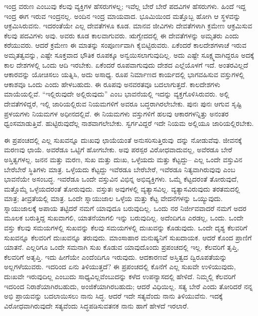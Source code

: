ಇಂದ್ರ ವರುಣ ಎಂಬುವು ಕೆಲವು ವ್ಯಕ್ತಿಗಳ ಹೆಸರುಗಳಲ್ಲ; ಇವೆಲ್ಲ ಬೇರೆ ಬೇರೆ ಪದವಿಗಳ ಹೆಸರುಗಳು. ಹಿಂದೆ ಇದ್ದ ಇಂದ್ರ ಈಗ ಇರುವ ಇಂದ್ರನಲ್ಲ. ಅಂದಿನ ಇಂದ್ರ ಮಾಯವಾದ. ಭೂಮಿಯಿಂದ ಮತ್ತೊಬ್ಬ ಹೋಗಿ ಆ ಸ್ಥಳವನ್ನು ಆಕ್ರಮಿಸಿರುವನು. ಇದರಂತೆಯೇ ಎಲ್ಲ ದೇವತೆಗಳೂ ಕೂಡ. ಮಾನವ ಜೀವಿಗಳು ದೇವತೆಗಳಾಗಿ ಕ್ರಮೇಣ ಆಕ್ರಮಿಸುವ ಕೆಲವು ಪದವಿಗಳು ಅವು. ಅವರು ಕೂಡ ಕಾಲವಾಗುವರು. ಋಗ್ವೇದದಲ್ಲಿ ಈ ದೇವತೆಗಳನ್ನು ಅಮೃತರು ಎಂದು ಕರೆಯುವರು. ಆದರೆ ಕ್ರಮೇಣ ಈ ಮಾತನ್ನು ಸಂಪೂರ್ಣವಾಗಿ ಕೈಬಿಟ್ಟಿರುವರು. ಏಕೆಂದರೆ ಕಾಲದೇಶಗಳಾಚೆ ಇರುವ ಅಮೃತತ್ವವನ್ನು, ಎಷ್ಟೇ ಸೂಕ್ತವಾದ ಭೌತಿಕ ರೂಪಕ್ಕೂ ಅನ್ವಯಿಸಲಾಗುವುದಿಲ್ಲ. ಅದು ಎಷ್ಟೇ ಸೂಕ್ಷ್ಮವಾಗಿದ್ದರೂ ಅದಕ್ಕೆ ಕಾಲ ದೇಶಗಳಲ್ಲಿ ಒಂದು ಆದಿ ಇರಬೇಕು. ಏಕೆಂದರೆ ರೂಪವಾಗುವುದು ದೇಶದ ಎಲ್ಲೆಯೊಳಗೆ ಇದೆ. ಅಂತರವಿಲ್ಲದೆ ಆಕಾರವನ್ನು ಯೋಚಿಸಲು ಯತ್ನಿಸಿ, ಅದು ಅಸಾಧ್ಯ. ರೂಪ ನಿರ್ಮಾಣದ ಕಾರ್ಯದಲ್ಲಿ ಭಾಗವಹಿಸುವ ವಸ್ತುಗಳಲ್ಲಿ ಆಕಾಶವೂ ಒಂದು ಎಂದು ಹೇಳಬಹುದು. ಈ ರೂಪವು ಅನವರತವೂ ಬದಲಾಗುತ್ತದೆ. ಕಾಲದೇಶಗಳು ಮಾಯೆಯಲ್ಲಿವೆ. “ಇಲ್ಲಿರುವುದೇ ಅಲ್ಲಿರುವುದು” ಎಂಬ ಭಾವನೆಯಲ್ಲಿ ಇದನ್ನು ವ್ಯಕ್ತಗೊಳಿಸಿರುವರು. ಅಲ್ಲಿ ದೇವತೆಗಳಿದ್ದರೆ, ಇಲ್ಲಿ ಜಾರಿಯಲ್ಲಿರುವ ನಿಯಮಗಳಿಗೆ ಅವರೂ ಬದ್ಧರಾಗಿರಲೇಬೇಕು. ಪುನಃ ಪುನಃ ಆಗುವ ಸೃಷ್ಟಿ ಪ್ರಳಯಗಳು ನಿಯಮಗಳ ಅಧೀನದಲ್ಲಿವೆ. ಈ ನಿಯಮಗಳು ವಸ್ತುಗಳಿಗೆ ಹಲವು ಆಕಾರಗಳನ್ನಿತ್ತು ಅನಂತರ ಧ್ವಂಸಮಾಡುತ್ತಿವೆ. ಹುಟ್ಟಿರುವುದೆಲ್ಲ ನಾಶವಾಗಲೇಬೇಕು. ಸ್ವರ್ಗವಿದ್ದರೆ ಇದೇ ನಿಯಮ ಅಲ್ಲಿಯೂ ಜಾರಿಯಲ್ಲಿರಬೇಕು.

\vskip 0.2cm 

ಈ ಪ್ರಪಂಚದಲ್ಲಿ ಎಲ್ಲ ಸುಖವನ್ನೂ ದುಃಖವು ಛಾಯೆಯಂತೆ ಅನುಸರಿಸುತ್ತಿರುವು\break\ ದನ್ನು ನೋಡುವೆವು. ಜೀವನಕ್ಕೆ ಮರಣವು ಛಾಯೆ. ಅವರೆಡೂ ಒಟ್ಟಿಗೆ ಹೋಗಬೇಕು. ಅವು ಪರಸ್ಪರ ವಿರೋಧವಾದುವಲ್ಲ, ಅವೆರಡೂ ಬೇರೆ ಅಸ್ತಿತ್ವಗಳಲ್ಲ. ಜನನ ಮತ್ತು ಮರಣ, ಸುಖ ಮತ್ತು ದುಃಖ, ಒಳ್ಳೆಯದು ಮತ್ತು ಕೆಟ್ಟದ್ದು– ಎಲ್ಲ ಒಂದೇ ವಸ್ತುವಿನ ಬೇರೆಬೇರೆ ಸ್ಥಿತಿಗಳು ಮಾತ್ರ. ಒಳ್ಳೆಯದು ಕೆಟ್ಟದ್ದು ಇವೆರಡೂ ಬೇರೆಬೇರೆ, ಇವೆರಡೂ ನಿತ್ಯವಾಗಿರುವುವು ಎಂಬ ಭಾವನೆಯೇ ಅಸಂಬದ್ಧ. ಇವರೆಡೂ ಒಂದೇ ವಸ್ತುವಿನ ವಿಭಿನ್ನ ಅಭಿವ್ಯಕ್ತಿಗಳು. ಒಮ್ಮೆ ಕೆಟ್ಟದರಂತೆ ತೋರುವುದೆ, ಮತ್ತೊಮ್ಮೆ ಒಳ್ಳೆಯದರಂತೆ ತೋರುವುದು. ವಸ್ತುತಃ ಅವುಗಳಲ್ಲಿ ವ್ಯತ್ಯಾಸವಿಲ್ಲ. ವ್ಯತ್ಯಾಸವಿರುವುದು ತರತಮದಲ್ಲಿ ಮಾತ್ರ; ತೀವ್ರತೆಯಲ್ಲಿ ಮಾತ್ರ. ಒಂದೇ ಸ್ನಾಯುಜಾಲ ಒಳ್ಳೆಯ ಮತ್ತು ಕೆಟ್ಟ ವೇದನೆಗಳನ್ನು ಒಯ್ಯುವುದು. ಸ್ನಾಯುಜಾಲಕ್ಕೆ ಅಪಾಯ ತಟ್ಟಿದರೆ ನಮಗೆ ಯಾವುದೂ ಬರುವುದಿಲ್ಲ. ಒಂದು ನರ ನಿರ್ಜೀವವಾದರೆ ನಮಗೆ ಅದರ ಮೂಲಕ ಬರುತ್ತಿದ್ದ ಸುಖವಾಗಲಿ, ಯಾತನೆಯಾಗಲಿ ಇನ್ನು ಬರುವುದಿಲ್ಲ. ಅದೆಂದಿಗೂ ಎರಡಲ್ಲ, ಒಂದು. ಒಂದೇ ವಸ್ತು ಕೆಲವು ಸಮಯಗಳಲ್ಲಿ ಸುಖವನ್ನು ಕೆಲವು ಸಮಯಗಳಲ್ಲಿ ದುಃಖವನ್ನು ಕೊಡುವುದು. ಒಂದೇ ದೃಶ್ಯ ಕೆಲವರಿಗೆ ಸುಖವನ್ನೂ ಕೆಲವರಿಗೆ ದುಃಖವನ್ನೂ ತರುವುದು. ಮಾಂಸಾಹಾರ ಮನುಷ್ಯನಿಗೆ ಸುಖದಾಯಕ. ಆದರೆ ಕೊಂದ ಪ್ರಾಣಿಗೆ ಯಾತನೆ. ಎಲ್ಲರಿಗೂ ಒಂದೇ ಸಮನಾಗಿ ಸುಖ ಕೊಡುವ ಯಾವುದೊಂದು ಪ್ರಪಂಚದಲ್ಲಿ ಇಲ್ಲ. ಕೆಲವರಿಗೆ ತೃಪ್ತಿ, ಕೆಲವರಿಗೆ ಅತೃಪ್ತಿ. ಇದು ಹೀಗೆಯೇ ಎಂದೆಂದಿಗೂ ಇರುವುದು. ಆದಕಾರಣವೆ ಅಸ್ತಿತ್ವದ ದ್ವಿರೂಪತೆಯನ್ನು ಅಲ್ಲಗಳೆಯುವರು. ಇದರಿಂದ ಏನು ತಿಳಿಯುತ್ತದೆ? ಈ ಪ್ರಪಂಚದಲ್ಲಿ ಕೊನೆಗೆ ಎಲ್ಲ ಸುಖವೇ ಉಳಿಯುವುದು, ದುಃಖವೇ ಇರುವುದಿಲ್ಲ ಎಂಬುದು ಸಾಧ್ಯವಿಲ್ಲವೆಂಬುದನ್ನು ಕಳೆದ ಉಪನ್ಯಾಸದಲ್ಲಿ ಹೇಳಿದೆ. ನಿಮ್ಮಲ್ಲಿ ಕೆಲವರಿಗೆ ಇದರಿಂದ ನಿರಾಶೆಯಾಗಿರಬಹುದು, ಅಂಜಿಕೆಯಾಗಿರಬಹುದು; ಆದರೆ ವಿಧಿಯಿಲ್ಲ. ಸತ್ಯ ಬೇರೆ ಎಂದು ತೋರಿದರೆ ನನ್ನ ಅಭಿ ಪ್ರಾಯವನ್ನು ಬದಲಾಯಿಸಲು ನಾನು ಸಿದ್ಧ. ಆದರೆ ಇದೇ ಸತ್ಯವೆಂದು ನಾನು ತಿಳಿಯುವೆನು. ಇದಕ್ಕೆ ವಿರೋಧವಾಗಿರುವುದೇ ಸತ್ಯವೆಂದು ಸಿದ್ಧಪಡಿಸುವತನಕ ನಾನು ಹಾಗೆ ಹೇಳದೆ ಇರಲಾರೆ.

